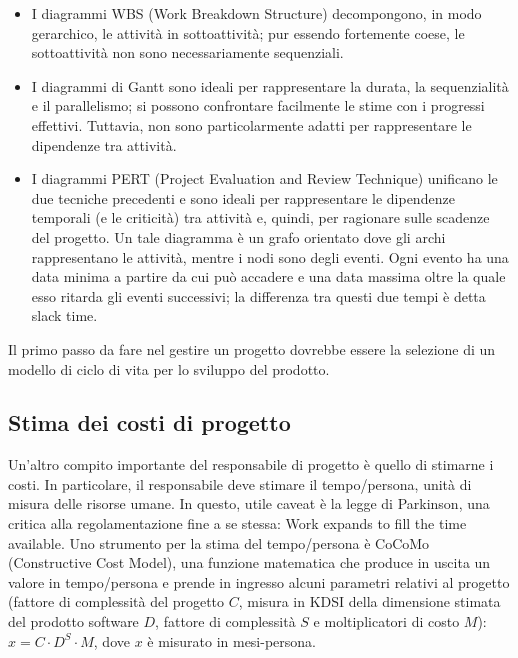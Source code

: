 \documentclass[a4paper]{article}
\begin{document}
	\begin{itemize}
		
			
	\item I diagrammi WBS (Work Breakdown Structure) decompongono, in modo gerarchico, le attività in sottoattività; pur essendo fortemente coese, le sottoattività non sono necessariamente sequenziali.
			
	\item I diagrammi di Gantt sono ideali per rappresentare la durata, la sequenzialità e il parallelismo; si possono confrontare facilmente le stime con i progressi effettivi. Tuttavia, non sono particolarmente adatti per rappresentare le dipendenze tra attività.
			
	\item I diagrammi PERT (Project Evaluation and Review Technique) unificano le due tecniche precedenti e sono ideali per rappresentare le dipendenze temporali (e le criticità) tra attività e, quindi, per ragionare sulle scadenze del progetto. Un tale diagramma è un grafo orientato dove gli archi rappresentano le attività, mentre i nodi sono degli eventi. Ogni evento ha una data minima a partire da cui può accadere e una data massima oltre la quale esso ritarda gli eventi successivi; la differenza tra questi due tempi è detta slack time.
		
	\end{itemize}

		
Il primo passo da fare nel gestire un progetto dovrebbe essere la selezione di un modello di ciclo di vita per lo sviluppo del prodotto.

		
	\subsection{Stima dei costi di progetto}

		
Un'altro compito importante del responsabile di progetto è quello di stimarne i costi. In particolare, il responsabile deve stimare il tempo/persona, unità di misura delle risorse umane. In questo, utile caveat è la legge di Parkinson, una critica alla regolamentazione fine a se stessa: Work expands to fill the time available. Uno strumento per la stima del tempo/persona è CoCoMo (Constructive Cost Model), una funzione matematica che produce in uscita un valore in tempo/persona e prende in ingresso alcuni parametri relativi al progetto (fattore di complessità del progetto $C$, misura in KDSI della dimensione stimata del prodotto software $D$, fattore di complessità $S$ e moltiplicatori di costo $M$): $x = C \cdot{} D^{S} \cdot{} M$, dove $x$ è misurato in mesi-persona.
\end{document}
